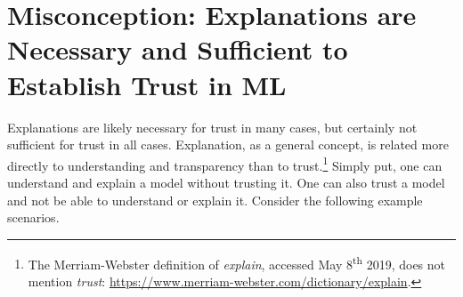 \documentclass[fleqn]{article}
\begin{document}
\section{Misconception: Explanations are Necessary and Sufficient to Establish Trust in ML}

Explanations are likely necessary for trust in many cases, but certainly not sufficient for trust in all cases. 
Explanation, as a general concept, is related more directly to understanding and transparency than to trust.\footnote{The Merriam-Webster definition of \textit{explain}, accessed May 8\textsuperscript{th} 2019, does not mention \textit{trust}: \url{https://www.merriam-webster.com/dictionary/explain}.} Simply put, one can understand and explain a model without trusting it. One can also trust a model and not be able to understand or explain it. Consider the following example scenarios.
\end{document}
